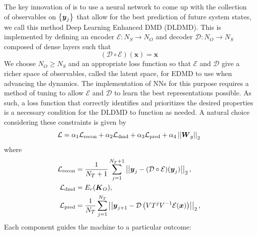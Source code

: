 The key innovation of 
\cite{lago} is to use a neural network to come up with the collection of 
observables on $\left\{\boldsymbol{y}_j\right\}$ that allow for the best prediction 
of future system states, we call this method Deep Learning Enhanced DMD (DLDMD). 
This is implemented by defining an encoder 
$\mathcal{E}: N_S \to N_O$ and decoder $\mathcal{D}: N_O \to N_S$ composed of 
dense layers such that 
\begin{equation}
    (\mathcal{D}\circ\mathcal{E})(\boldsymbol{x}) = \boldsymbol{x}
\end{equation}
We choose $N_O \geq N_S$ and an appropriate loss function so that 
$\mathcal{E}$ and $\mathcal{D}$ give a richer space of observables, called the 
latent space, for EDMD to use when advancing the dynamics. The implementation 
of NNs for this purpose requires a method of tuning to allow $\mathcal{E}$ and 
$\mathcal{D}$ to learn the best representations possible. As such, a loss 
function that correctly identifies and prioritizes the desired properties is 
a necessary condition for the DLDMD to function as needed. A natural choice
considering these constraints is given by
\begin{equation}
    \mathcal{L} = \alpha_1 \mathcal{L}_{\text{recon}} + \alpha_2 \mathcal{L}
    _{\text{dmd}} + \alpha_3 \mathcal{L}_{\text{pred}} +\alpha_4 
    \left|\left|\boldsymbol{W}_g\right|\right|_2 \label{eqn:loss function} 
\end{equation}
where 
\begin{align}
    \mathcal{L}_{\text{recon}} &= \frac{1}{N_T + 1}\sum_{j=1}^{N_T+1}\left|\left|\boldsymbol{y}_j - 
    (\mathcal{D}\circ\mathcal{E})(\boldsymbol{y}_j)\right|\right|_2, \\
    \mathcal{L}_{\text{dmd}} &= E_r(\boldsymbol{K}_O), \\
    \mathcal{L}_{\text{pred}} &= \frac{1}{N_T}\sum_{j=1}^{N_T}\left|\left|\boldsymbol{y}_{j+1} - 
    \mathcal{D}\left(VT^j V^{-1}\mathcal{E}(\boldsymbol{x})\right)\right|\right|_2, \label{eqn:blah}
\end{align}
Each component guides the machine to a particular outcome: 
